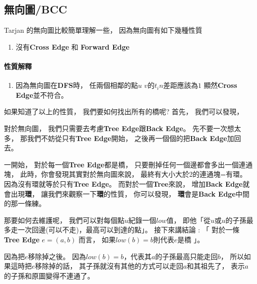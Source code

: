 \documentclass[12pt,oneside]{article}
\begin{document}
\subsection{無向圖/BCC}

Tarjan 的無向圖比較簡單理解一些，
因為無向圖有如下幾種性質
\vspace*{1em}
\begin{adjustwidth}{2em}{0em}
\begin{enumerate}
    \item 沒有\textbf{Cross Edge} 和 \textbf{Forward Edge}
\end{enumerate}
\end{adjustwidth}
\vspace*{1em}

\paragraph{性質解釋}
\begin{adjustwidth}{2em}{0em}
\begin{enumerate}
    \item
        因為無向圖在\textbf{DFS}時，
        任兩個相鄰的點$u$ $v$的$t_in$差距應該為$1$
        顯然\textbf{Cross Edge}並不符合。
\end{enumerate}
\end{adjustwidth}

如果知道了以上的性質，
我們要如何找出所有的橋呢?
首先，
我們可以發現，

對於無向圖，
我們只需要去考慮\textbf{Tree Edge}跟\textbf{Back Edge}。
先不要一次想太多，
那我們不妨從只有\textbf{Tree Edge}開始，
之後再一個個的把\textbf{Back Edge}加回去。

一開始，
對於每一個\textbf{Tree Edge}都是橋，
只要刪掉任何一個邊都會多出一個連通塊，
此時，你會發現其實對於無向圖來說，
{\color{red} 最終有大小大於2的連通塊=有環}。%
因為沒有環就等於只有\textbf{Tree Edge}。
而對於一個\textbf{Tree}來說，
增加\textbf{Back Edge}就會出現\textbf{環}，
讓我們來觀察一下\textbf{環}的性質，
你可以發現，
\textbf{環}會是\textbf{Back Edge}中間的那一條練。

那要如何去維護呢，
我們可以對每個點$u$紀錄一個$low$值，
即他「從$u$或$u$的子孫最多走一次回邊(可以不走)，最高可以到達的點」。
接下來講結論 : 「
對於一條\textbf{Tree Edge} $e = (a, b)$ 而言，
如果$low(b) = b$則代表$e$是橋
」。

因為把$e$移除掉之後。
因為$low(b) = b$，代表其$a$的子孫最高只能走回$b$，
所以如果這時把$e$移除掉的話，
其子孫就沒有其他的方式可以走回$a$和其祖先了，
表示$a$的子孫和原圖變得不連通了。
\end{document}
